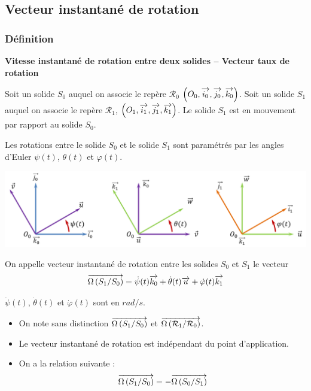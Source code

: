 \documentclass[10pt,oneside]{article}
\begin{document}
\subsection{Vecteur instantané de rotation}

\subsubsection{Définition}

\begin{defi}
\textbf{Vitesse instantané de rotation entre deux solides -- Vecteur taux de rotation}

Soit un solide $S_0$ auquel on associe le repère $\mathcal{R}_0$ $\left(O_0,\overrightarrow{i_0},\overrightarrow{j_0},\overrightarrow{k_0} \right)$.  Soit un solide $S_1$ auquel on associe le repère $\mathcal{R}_1$,  $\left(O_1,\overrightarrow{i_1},\overrightarrow{j_1},\overrightarrow{k_1} \right)$. Le solide $S_1$ est en mouvement par rapport au solide $S_0$. 


\begin{minipage}[c]{.3\linewidth} 
Les rotations entre le solide $S_0$ et le solide $S_1$ sont paramétrés par les angles d'Euler $\psi(t)$, $\theta(t)$ et $\varphi(t)$.
\end{minipage}\hfill
\begin{minipage}[c]{.65\linewidth}
\begin{center}
\includegraphics[width=\textwidth]{png/euler}
\end{center}
\end{minipage}

\vspace{.25cm}

On appelle vecteur instantané de rotation entre les solides $S_0$ et $S_1$ le vecteur
$$
\overrightarrow{\Omega\left( {S_1}/{S_0}\right)} = \dot{\psi}(t) \overrightarrow{k_0} + \dot{\theta}(t) \overrightarrow{u} + \dot{\varphi}(t) \overrightarrow{k_1}
$$

$\dot{\psi}(t) $, $\dot{\theta}(t) $ et $\dot{\varphi}(t) $ sont en $rad/s$. 
\end{defi}

\begin{rem}

\begin{itemize}
\item On note sans distinction $\overrightarrow{\Omega\left( {S_1}/{S_0}\right)}$ et $\overrightarrow{\Omega\left( {\mathcal{R}_1}/{\mathcal{R}_0}\right)}$.
\item Le vecteur instantané de rotation est indépendant du point d'application.
\item On a la relation suivante :
$$\overrightarrow{\Omega\left( {S_1}/{S_0}\right)} = -\overrightarrow{\Omega\left( {S_0}/{S_1}\right)}$$
\end{itemize}
\end{rem}
\end{document}
